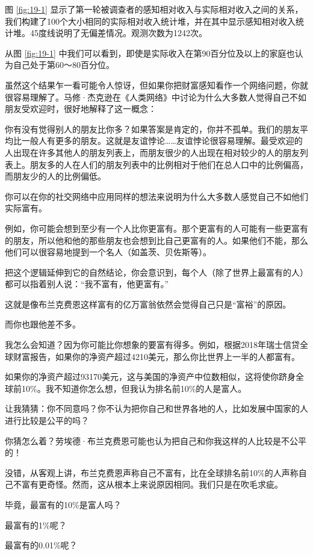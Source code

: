 图 \ref{fig:19-1} 显示了第一轮被调查者的感知相对收入与实际相对收入之间的关系，我们构建了100个大小相同的实际相对收入统计堆，并在其中显示感知相对收入统计堆。45度线说明了无偏差情况。观测次数为1242次。

从图 \ref{fig:19-1} 中我们可以看到，即使是实际收入在第90百分位及以上的家庭也认为自己处于第60～80百分位。

虽然这个结果乍一看可能令人惊讶，但如果你把财富感知看作一个网络问题，你就很容易理解了。马修·杰克逊在《人类网络》中讨论为什么大多数人觉得自己不如朋友受欢迎时，很好地解释了这一概念：

你有没有觉得别人的朋友比你多？如果答案是肯定的，你并不孤单。我们的朋友平均比一般人有更多的朋友。这就是友谊悖论……友谊悖论很容易理解。最受欢迎的人出现在许多其他人的朋友列表上，而朋友很少的人出现在相对较少的人的朋友列表上。朋友多的人在人们的朋友列表中的比例相对于他们在总人口中的比例偏高，而朋友少的人的比例偏低。

你可以在你的社交网络中应用同样的想法来说明为什么大多数人感觉自己不如他们实际富有。

例如，你可能会想到至少有一个人比你更富有。那个更富有的人可能有一些更富有的朋友，所以他和他的那些朋友也会想到比自己更富有的人。如果他们不能，那么他们可以很容易地提到一个名人（如盖茨、贝佐斯等）。

把这个逻辑延伸到它的自然结论，你会意识到，每个人（除了世界上最富有的人）都可以指着别人说：“我不富有，他更富有。”

这就是像布兰克费恩这样富有的亿万富翁依然会觉得自己只是“富裕”的原因。

而你也跟他差不多。

我怎么会知道？因为你可能比你想象的要富有得多。例如，根据2018年瑞士信贷全球财富报告，如果你的净资产超过4210美元，那么你比世界上一半的人都富有。

如果你的净资产超过93170美元，这与美国的净资产中位数相似，这将使你跻身全球前10\%。我不知道你怎么想，但我认为排名前10\%的人是富人。

让我猜猜：你不同意吗？你不认为把你自己和世界各地的人，比如发展中国家的人进行比较是公平的吗？

你猜怎么着？劳埃德·布兰克费恩可能也认为把自己和你我这样的人比较是不公平的！

没错，从客观上讲，布兰克费恩声称自己不富有，比在全球排名前10\%的人声称自己不富有更奇怪。然而，这从根本上来说原因相同。我们只是在吹毛求疵。

毕竟，最富有的10\%是富人吗？

最富有的1\%呢？

最富有的0.01\%呢？

